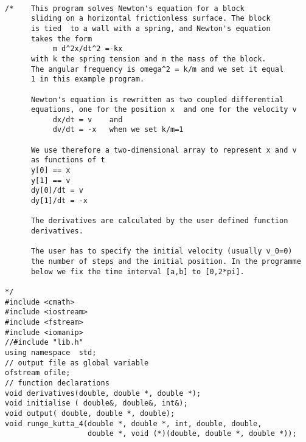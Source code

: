 \documentclass[%
oneside,                 %
final,                   %
10pt]{article}
\begin{document}
\paragraph{}
\begin{verbatim}
/*    This program solves Newton's equation for a block
      sliding on a horizontal frictionless surface. The block
      is tied  to a wall with a spring, and Newton's equation
      takes the form
           m d^2x/dt^2 =-kx
      with k the spring tension and m the mass of the block.
      The angular frequency is omega^2 = k/m and we set it equal
      1 in this example program. 

      Newton's equation is rewritten as two coupled differential
      equations, one for the position x  and one for the velocity v
           dx/dt = v    and
           dv/dt = -x   when we set k/m=1

      We use therefore a two-dimensional array to represent x and v
      as functions of t
      y[0] == x
      y[1] == v
      dy[0]/dt = v
      dy[1]/dt = -x

      The derivatives are calculated by the user defined function 
      derivatives.

      The user has to specify the initial velocity (usually v_0=0)
      the number of steps and the initial position. In the programme
      below we fix the time interval [a,b] to [0,2*pi].

*/ 
#include <cmath>
#include <iostream>
#include <fstream>
#include <iomanip>
//#include "lib.h"
using namespace  std;
// output file as global variable
ofstream ofile;
// function declarations
void derivatives(double, double *, double *);
void initialise ( double&, double&, int&);
void output( double, double *, double);
void runge_kutta_4(double *, double *, int, double, double, 
                   double *, void (*)(double, double *, double *));


\end{verbatim}
\end{document}
